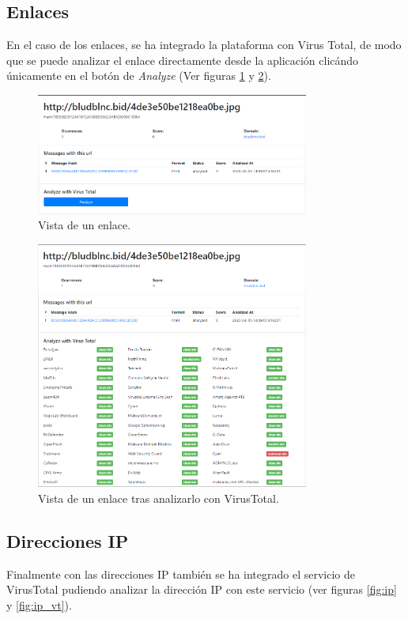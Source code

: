 \clearpage
\subsection{Enlaces}
En el caso de los enlaces, se ha integrado la plataforma con Virus Total, de modo que se puede analizar el enlace directamente desde la aplicación clicándo únicamente en el botón de \textit{Analyze} (Ver figuras \ref{fig:enlace} y \ref{fig:enlace_vt}).

\begin{figure}[htb]
    \centering
    \includegraphics[width=0.8\textwidth]{imagenes/capturasAplicacion/Enlaces.png}
\caption{Vista de un enlace.}
\label{fig:enlace}
\end{figure}


\begin{figure}[htb]
    \centering
    \includegraphics[width=0.8\textwidth]{imagenes/capturasAplicacion/Enlaces_virusTotal.png}
\caption{Vista de un enlace tras analizarlo con VirusTotal.}
\label{fig:enlace_vt}
\end{figure}

\clearpage
\subsection{Direcciones IP}
Finalmente con las direcciones IP también se ha integrado el servicio de VirusTotal pudiendo analizar la dirección IP con este servicio (ver figuras \ref{fig:ip} y \ref{fig:ip_vt}).

